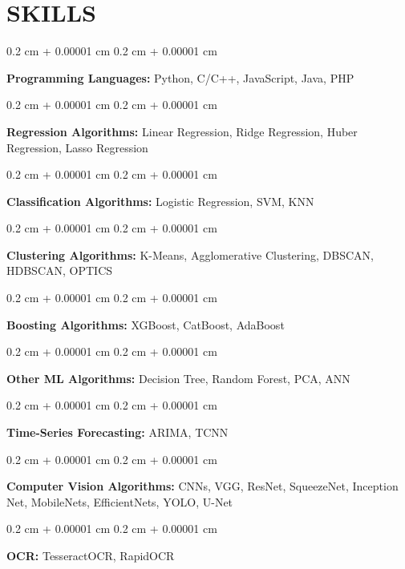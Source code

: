 \documentclass[10pt, letterpaper]{article}
\newenvironment{onecolentry}{
    \begin{adjustwidth}{
        0.2 cm + 0.00001 cm
    }{
        0.2 cm + 0.00001 cm
    }
}{
    \end{adjustwidth}
} %
\begin{document}
    \section{SKILLS}
        \begin{onecolentry}
            \textbf{Programming Languages:} Python, C/C++, JavaScript, Java, PHP
        \end{onecolentry}
        \vspace{0.1 cm}
        \begin{onecolentry}
            \textbf{Regression Algorithms:} Linear Regression, Ridge Regression, Huber Regression, Lasso Regression
        \end{onecolentry}
        \vspace{0.1 cm}
        \begin{onecolentry}
            \textbf{Classification Algorithms:} Logistic Regression, SVM, KNN
        \end{onecolentry}
        \vspace{0.1 cm}
        \begin{onecolentry}
            \textbf{Clustering Algorithms:} K-Means, Agglomerative Clustering, DBSCAN, HDBSCAN, OPTICS
        \end{onecolentry}
        \vspace{0.1 cm}
        \begin{onecolentry}
            \textbf{Boosting Algorithms:} XGBoost, CatBoost, AdaBoost
        \end{onecolentry}
        \vspace{0.1 cm}
        \begin{onecolentry}
            \textbf{Other ML Algorithms:} Decision Tree, Random Forest, PCA, ANN
        \end{onecolentry}
        \vspace{0.1 cm}
        \begin{onecolentry}
            \textbf{Time-Series Forecasting:} ARIMA, TCNN
        \end{onecolentry}
        \vspace{0.1 cm}
        \begin{onecolentry}
            \textbf{Computer Vision Algorithms:} CNNs, VGG, ResNet, SqueezeNet, Inception Net, MobileNets, EfficientNets, YOLO, U-Net
        \end{onecolentry}
        \vspace{0.1 cm}
        \begin{onecolentry}
            \textbf{OCR:} TesseractOCR, RapidOCR
        \end{onecolentry}
\end{document}

